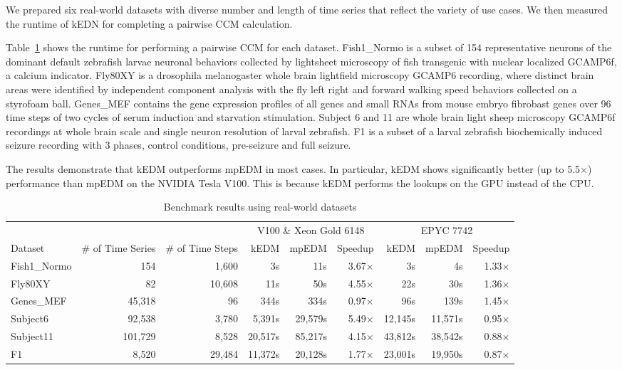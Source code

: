 \documentclass[sigconf]{acmart}
\begin{document}
We prepared six real-world datasets with diverse number and length of time
series that reflect the variety of use cases. We then measured the runtime of kEDN for completing a pairwise CCM calculation.

Table~\ref{tbl:real-world} shows the runtime for performing a pairwise CCM for
each dataset.
Fish1\_Normo is a subset of 154 representative neurons of the dominant default zebrafish larvae neuronal behaviors collected by lightsheet microscopy of fish transgenic with nuclear localized GCAMP6f, a calcium indicator. Fly80XY is a drosophila melanogaster whole brain lightfield microscopy GCAMP6 recording, where distinct brain areas were identified by independent component analysis with the fly left right and forward walking speed behaviors collected on a styrofoam ball. Genes\_MEF contains the gene expression profiles of all genes and small RNAs from mouse embryo fibrobast genes over 96 time steps of two cycles of serum induction and starvation stimulation. Subject 6 and 11 are whole brain light sheep microscopy GCAMP6f recordings at whole brain scale and single neuron resolution of larval zebrafish. F1 is a subset of a larval zebrafish biochemically induced seizure recording with 3 phases, control conditions, pre-seizure and full seizure. 

The results demonstrate that kEDM outperforms mpEDM in most
cases. In particular, kEDM shows significantly better (up to 5.5$\times$)
performance than mpEDM on the NVIDIA Tesla V100\@. This is because kEDM performs the lookups on the GPU instead of the CPU\@.

\begin{table}
\centering
\caption{Benchmark results using real-world datasets}%
\label{tbl:real-world}
\begin{tabular}{@{}lrrrrrrrr@{}}
\toprule
             & \multicolumn{1}{c}{} & \multicolumn{1}{c}{} & \multicolumn{3}{c}{V100 \& Xeon Gold 6148 } & \multicolumn{3}{c}{EPYC 7742} \\ \cmidrule(l){4-6}  \cmidrule(l){7-9}
Dataset      & \multicolumn{1}{c}{\# of Time Series} & \multicolumn{1}{c}{\# of Time Steps} & kEDM & mpEDM & Speedup & kEDM & mpEDM & Speedup \\ \midrule
Fish1\_Normo &  154    & 1,600  &      3s &     11s & 3.67$\times$ &      3s &      4s & 1.33$\times$ \\
Fly80XY      &  82     & 10,608 &     11s &     50s & 4.55$\times$ &     22s &     30s & 1.36$\times$ \\
Genes\_MEF   &  45,318 & 96     &    344s &    334s & 0.97$\times$ &     96s &    139s & 1.45$\times$ \\
Subject6     &  92,538 & 3,780  &  5,391s & 29,579s & 5.49$\times$ & 12,145s & 11,571s & 0.95$\times$ \\
Subject11    & 101,729 & 8,528  & 20,517s & 85,217s & 4.15$\times$ & 43,812s & 38,542s & 0.88$\times$ \\
F1           &  8,520  & 29,484 & 11,372s & 20,128s & 1.77$\times$ & 23,001s & 19,950s & 0.87$\times$ \\ \bottomrule
\end{tabular}
\end{table}
\end{document}
